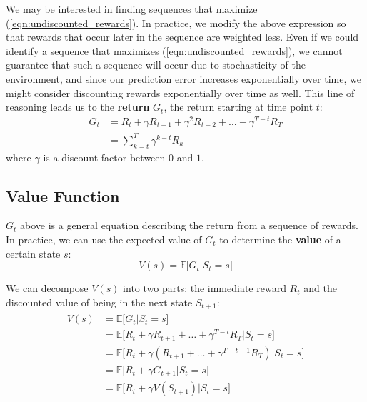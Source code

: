 \documentclass[journal, onecolumn, 12pt, draftclsnofoot]{IEEEtran}
\numberwithin{equation}{section}
\newcommand{\kword}[1]{\textbf{#1}}
\begin{document}
	We may be interested in finding sequences that maximize (\ref{eqn:undiscounted_rewards}). In practice, we modify the above expression so that rewards that occur later in the sequence are weighted less. Even if we could identify a sequence that maximizes (\ref{eqn:undiscounted_rewards}), we cannot guarantee that such a sequence will occur due to stochasticity of the environment, and since our prediction error increases exponentially over time, we might consider discounting rewards exponentially over time as well. This line of reasoning leads us to the \kword{return} $G_t$, the return starting at time point $t$:
	\begin{align}
		\label{eqn:G}
		G_t &= R_{t} + \gamma R_{t+1} + \gamma^2 R_{t+2} + \dots + \gamma^{T-t} R_T \\
		&= \sum_{k=t}^T \gamma^{k-t} R_k \nonumber
	\end{align}
	where $\gamma$ is a discount factor between $0$ and $1$.

	\subsection{Value Function}
	\par $G_t$ above is a general equation describing the return from a sequence of rewards. In practice, we can use the expected value of $G_t$ to determine the \kword{value} of a certain state $s$:
	\begin{equation}
		\label{eqn:value}
		V(s) = \mathbb{E}\big[ G_t \vert S_t = s \big]
	\end{equation}

	We can decompose $V(s)$ into two parts: the immediate reward $R_t$ and the discounted value of being in the next state $S_{t+1}$:
	\begin{align}
		\label{eqn:bellman}
		\begin{split}
			V(s) &= \mathbb{E} \big[ G_t \vert S_t = s \big] \\
					&= \mathbb{E} \big[ R_{t} + \gamma R_{t+1} + \dots + \gamma^{T-t} R_T \vert S_t = s \big] \\
					&= \mathbb{E}\big[R_{t} + \gamma (R_{t+1} + \dots + \gamma^{T-t-1} R_T) \vert S_t = s\big] \\
					&= \mathbb{E}\big[ R_{t} + \gamma G_{t+1} \vert S_t = s \big] \\
					&= \mathbb{E} \big[ R_{t} + \gamma V(S_{t+1}) \vert S_t = s \big] \\
		\end{split}
	\end{align}
\end{document}
